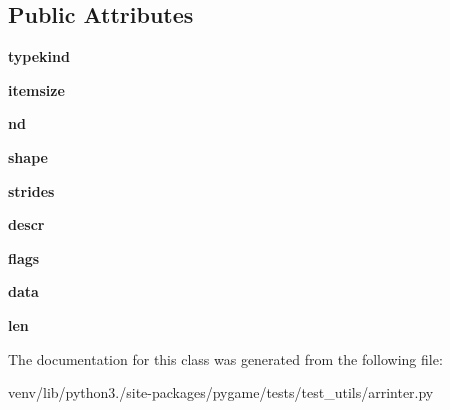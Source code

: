 \subsection*{Public Attributes}
\begin{DoxyCompactItemize}
\item 
\mbox{\label{classpygame_1_1tests_1_1test__utils_1_1arrinter_1_1_exporter_a44ef27e7c1745ec4733a9643375393af}} 
{\bfseries typekind}
\item 
\mbox{\label{classpygame_1_1tests_1_1test__utils_1_1arrinter_1_1_exporter_a4a57ed9f5a257ed8b4ade241d4399da9}} 
{\bfseries itemsize}
\item 
\mbox{\label{classpygame_1_1tests_1_1test__utils_1_1arrinter_1_1_exporter_a1b73b0db7e96dafcfb00fb1a2efb4425}} 
{\bfseries nd}
\item 
\mbox{\label{classpygame_1_1tests_1_1test__utils_1_1arrinter_1_1_exporter_a208d745338093decb478d2cc52447259}} 
{\bfseries shape}
\item 
\mbox{\label{classpygame_1_1tests_1_1test__utils_1_1arrinter_1_1_exporter_a2a29a8d0129e039349c3d2139cfa48ca}} 
{\bfseries strides}
\item 
\mbox{\label{classpygame_1_1tests_1_1test__utils_1_1arrinter_1_1_exporter_a5a1aef1150068e38c551aeb7ff8b4c08}} 
{\bfseries descr}
\item 
\mbox{\label{classpygame_1_1tests_1_1test__utils_1_1arrinter_1_1_exporter_ae56185b54b44f994282b4a92c23ac112}} 
{\bfseries flags}
\item 
\mbox{\label{classpygame_1_1tests_1_1test__utils_1_1arrinter_1_1_exporter_a47eebe64154337d4ec6432c215fb2633}} 
{\bfseries data}
\item 
\mbox{\label{classpygame_1_1tests_1_1test__utils_1_1arrinter_1_1_exporter_afcebb0831ba7028b1f0ec5094c94c008}} 
{\bfseries len}
\end{DoxyCompactItemize}


The documentation for this class was generated from the following file\+:\begin{DoxyCompactItemize}
\item 
venv/lib/python3./site-\/packages/pygame/tests/test\+\_\+utils/arrinter.\+py\end{DoxyCompactItemize}
